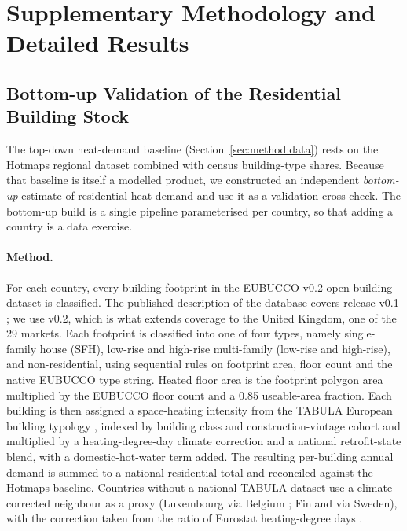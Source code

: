 \section{Supplementary Methodology and Detailed Results}
\label{app:detail}

\subsection{Bottom-up Validation of the Residential Building Stock}
\label{sec:method:bottomup}

The top-down heat-demand baseline (Section~\ref{sec:method:data}) rests on the
Hotmaps regional dataset combined with census building-type shares. Because that
baseline is itself a modelled product, we constructed an independent
\emph{bottom-up} estimate of residential heat demand and use it as a validation
cross-check. The bottom-up build is a single pipeline parameterised per country, so that adding a country is a data exercise.

\paragraph{Method.} For each country, every building footprint in the EUBUCCO v0.2 open building dataset \citep{Eubucco2023v02} is classified. The published description of the database covers release v0.1 \citep{MilojevicDupont2023Eubucco}; we use v0.2, which is what extends coverage to the United Kingdom, one of the 29 markets. Each footprint is classified into
one of four types, namely single-family house (SFH), low-rise and high-rise
multi-family (low-rise and high-rise), and non-residential, using sequential rules on
footprint area, floor count and the native EUBUCCO type string. Heated floor area
is the footprint polygon area multiplied by the EUBUCCO floor count and a 0.85
useable-area fraction. Each building is then assigned a space-heating intensity
from the TABULA European building typology \citep{Loga2016Tabula}, indexed by
building class and construction-vintage cohort and multiplied by a
heating-degree-day climate correction and a national retrofit-state blend, with a
domestic-hot-water term added. The resulting per-building annual demand is summed
to a national residential total and reconciled against the Hotmaps baseline.
Countries without a national TABULA dataset use a climate-corrected neighbour as a
proxy (Luxembourg via Belgium \citep{Cyx2011TabulaBelgium}; Finland via Sweden),
with the correction taken from the ratio of Eurostat heating-degree days
\citep{EurostatHDD2025}.

